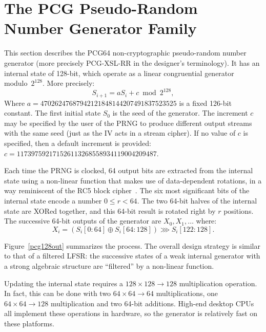\documentclass[preprint]{iacrtrans}
\begin{document}
\section{The PCG Pseudo-Random Number Generator Family}

This section describes the \textsf{PCG64} non-cryptographic pseudo-random number
generator (more precisely \textsf{PCG-XSL-RR} in the designer's terminology). It
has an internal state of 128-bit, which operate as a linear congruential
generator modulo~$2^{128}$. More precisely:
\[
  S_{i+1} = a S_i + c \bmod 2^{128},
\]
Where $a = 47026247687942121848144207491837523525$ is a fixed 126-bit
constant. The first initial state $S_0$ is the seed of the generator. The
increment $c$ may be specified by the user of the PRNG to produce different
output streams with the same seed (just as the IV acts in a stream cipher). If
no value of $c$ is specified, then a default increment is provided:
$c = 117397592171526113268558934119004209487$.

Each time the PRNG is clocked, 64 output bits are extracted from the internal
state using a non-linear function that makes use of data-dependent rotations, in
a way reminiscent of the \textsf{RC5} block cipher~\cite{Rivest94}. The six most
significant bits of the internal state encode a number $0 \leq r < 64$. The two
64-bit halves of the internal state are XORed together, and this 64-bit result
is rotated right by $r$ positions. The successive 64-bit outputs of the
generator are $X_0, X_1, \dots$ where:
\[
  X_i =(S_i[0:64] \oplus S_i[64:128]) \ggg S_i[122:128].
\]

Figure~\ref{pcg128out} summarizes the process. The overall design strategy is
similar to that of a filtered LFSR: the successive states of a weak internal
generator with a strong algebraic structure are ``filtered'' by a non-linear
function.

Updating the internal state requires a $128 \times 128 \rightarrow 128$
multiplication operation. In fact, this can be done with two
$64 \times 64 \rightarrow 64$ multiplications, one
$64 \times 64 \rightarrow 128$ multiplication and two 64-bit additions. High-end
desktop CPUs all implement these operations in hardware, so the generator is
relatively fast on these platforms.
\end{document}
